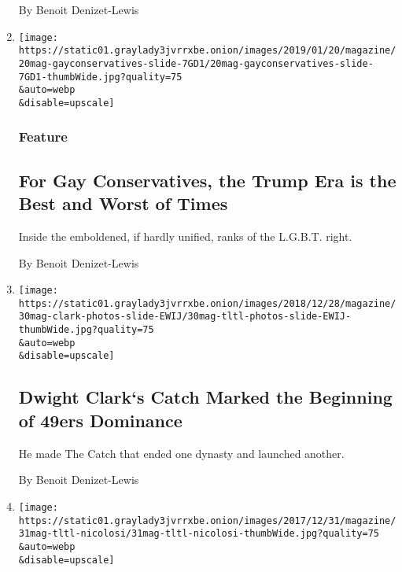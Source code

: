 \begin{enumerate}
  By Benoit Denizet-Lewis
\item
  \href{/2019/01/11/magazine/gay-conservative-trump-era.html}{}

  \texttt{[image: https://static01.graylady3jvrrxbe.onion/images/2019/01/20/magazine/20mag-gayconservatives-slide-7GD1/20mag-gayconservatives-slide-7GD1-thumbWide.jpg?quality=75\\\&auto=webp\\\&disable=upscale]}

  \hypertarget{feature}{%
  \subsubsection{Feature}\label{feature}}

  \hypertarget{for-gay-conservatives-the-trump-era-is-the-best-and-worst-of-times}{%
  \subsection{For Gay Conservatives, the Trump Era is the Best and Worst
  of
  Times}\label{for-gay-conservatives-the-trump-era-is-the-best-and-worst-of-times}}

  Inside the emboldened, if hardly unified, ranks of the L.G.B.T. right.

  By Benoit Denizet-Lewis
\item
  \href{/interactive/2018/12/27/magazine/lives-they-lived-dwight-clark.html}{}

  \texttt{[image: https://static01.graylady3jvrrxbe.onion/images/2018/12/28/magazine/30mag-clark-photos-slide-EWIJ/30mag-tltl-photos-slide-EWIJ-thumbWide.jpg?quality=75\\\&auto=webp\\\&disable=upscale]}

  \hypertarget{dwight-clarks-catch-marked-the-beginning-of-49ers-dominance}{%
  \subsection{Dwight Clark`s Catch Marked the Beginning of 49ers
  Dominance}\label{dwight-clarks-catch-marked-the-beginning-of-49ers-dominance}}

  He made The Catch that ended one dynasty and launched another.

  By Benoit Denizet-Lewis
\item
  \href{/interactive/2017/12/28/magazine/the-lives-they-lived-joseph-nicolosi.html}{}

  \texttt{[image: https://static01.graylady3jvrrxbe.onion/images/2017/12/31/magazine/31mag-tltl-nicolosi/31mag-tltl-nicolosi-thumbWide.jpg?quality=75\\\&auto=webp\\\&disable=upscale]}


\end{enumerate}
